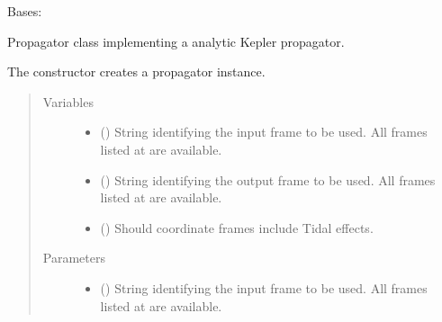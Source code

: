 \documentclass[letterpaper,10pt,english]{sphinxmanual}
\begin{document}
\begin{fulllineitems}
\label{\detokenize{modules/propagator_kepler:propagator_kepler.PropagatorKepler}}
Bases: {\hyperref[\detokenize{modules/propagator_base:propagator_base.PropagatorBase}]{}}

Propagator class implementing a analytic Kepler propagator.

The constructor creates a propagator instance.
\begin{quote}\begin{description}
\item[{Variables}] \leavevmode\begin{itemize}
\item {} 
 () \textendash{} String identifying the input frame to be used. All frames listed at  are available.

\item {} 
 () \textendash{} 
String identifying the output frame to be used. All frames listed at  are available.


\item {} 
 () \textendash{} Should coordinate frames include Tidal effects.

\end{itemize}

\item[{Parameters}] \leavevmode\begin{itemize}
\item {} 
 () \textendash{} 
String identifying the input frame to be used. All frames listed at  are available.



\end{itemize}
\end{description}
\end{quote}
\end{fulllineitems}
\end{document}
